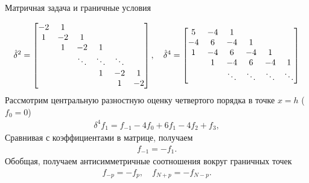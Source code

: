 \documentclass[10pt,pdf,hyperref={unicode},xcolor=dvipsnames]{beamer}
\begin{document}
\begin{frame}{Матричная задача и граничные условия}
    \begin{block}{}
        \vspace*{-0.5cm}
        \begin{gather}
            \hat{\delta}^2 = 
            \begin{bmatrix}
                -2 &  1 &        &        &        &    \\
                1  & -2 &  1     &        &        &    \\
                   &  1 & -2     & 1      &        &    \\
                   &    & \ddots & \ddots & \ddots &    \\
                   &    &        &   1    &  -2    &  1 \\
                   &    &        &        &   1    & -2 \\
            \end{bmatrix}, \quad 
            \hat{\delta}^4 = 
            \begin{bmatrix}
                5 & -4     &  1     &        &        &        \\
               -4 &  6     & -4     &  1     &        &        \\ 
                1 & -4     &  6     & -4     & 1      &        \\
                  &  1     & -4     &  6     & -4     & 1      \\ 
                  &        & \ddots & \ddots & \ddots & \ddots \\  
            \end{bmatrix} \notag
        \end{gather}
        Рассмотрим центральную разностную оценку четвертого порядка в точке $x = h$ ($f_0 = 0$)
        \begin{gather}
            \delta^4 f_1 = f_{-1} - 4 f_0 + 6 f_1 - 4f_2 + f_3, 
        \end{gather}
        Сравнивая с коэффициентами в матрице, получаем 
        \begin{gather}
            f_{-1} = - f_1.
        \end{gather}
        Обобщая, получаем антисимметричные соотношения вокруг граничных точек
        \vspace*{-0.3cm}
        \begin{gather}
            f_{-p} = - f_{p}, \quad f_{N+p} = - f_{N-p}.
        \end{gather}
    \end{block}
\end{frame}
\end{document}
